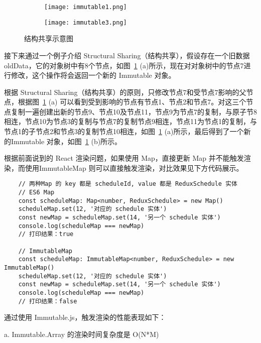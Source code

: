 \begin{figure}[!htp]
    \centering
    \begin{subfigure}{1\textwidth}
      \centering
      \texttt{[image: immutable1.png]}
      \caption{}
    \end{subfigure}
    \begin{subfigure}{1\textwidth}
      \centering
      \texttt{[image: immutable3.png]}
      \caption{}
    \end{subfigure}
    \caption{结构共享示意图}
    \label{fig:immutable}
  \end{figure}

  接下来通过一个例子介绍 Structural Sharing（结构共享），假设存在一个旧数据 oldData，它的对象树中有8个节点，如图~\ref{fig:immutable} (a)所示，现在对对象树中的节点7进行修改，这个操作将会返回一个新的 Immutable 对象。

   根据 Structural Sharing（结构共享）的原则，只修改节点7和受节点7影响的父节点，根据图~\ref{fig:immutable} (a) 可以看到受到影响的节点有节点1、节点2和节点7。对这三个节点复制一遍创建出新的节点9、节点10及节点11，节点9为节点7的复制，与原子节8相连，节点10为节点3的复制与节点7的复制节点9相连，节点11为节点1的复制，与节点1的子节点2和节点3的复制节点10相连，如图~\ref{fig:immutable} (a)所示，最后得到了一个新的Immutable 对象，如图~\ref{fig:immutable} (b)所示。

  根据前面说到的 React 渲染问题，如果使用 Map，直接更新 Map 并不能触发渲染，而使用ImmutableMap 则可以直接触发渲染，对比效果见下方代码展示。

  {\setmainfont{Courier New Bold}
  \begin{lstlisting}
    // 两种Map 的 key 都是 scheduleId, value 都是 ReduxSchedule 实体
    // ES6 Map
    const scheduleMap: Map<number, ReduxSchedule> = new Map()
    scheduleMap.set(12, '对应的 schedule 实体')
    const newMap = scheduleMap.set(14, '另一个 schedule 实体')
    console.log(scheduleMap === newMap)
    // 打印结果：true

    // ImmutableMap
    const scheduleMap: ImmutableMap<number, ReduxSchedule> = new ImmutableMap()
    scheduleMap.set(12, '对应的 schedule 实体')
    const newMap = scheduleMap.set(14, '另一个 schedule 实体')
    console.log(scheduleMap === newMap)
    // 打印结果：false
   \end{lstlisting}}

  通过使用 Immutable.js，触发渲染的性能表现如下：

  \quad{}a. Immutable.Array 的渲染时间复杂度是 O(N*M)

